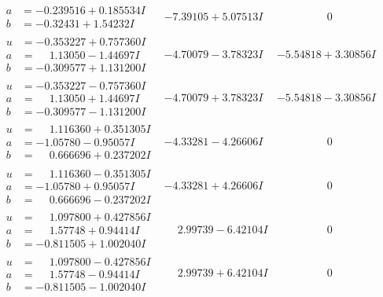 \documentclass[1p]{elsarticle_modified}
\theoremstyle{definition}
\begin{document}
$$\begin{array}{c|c|c}
\begin{aligned}
a &= -0.239516 + 0.185534 I \\
b &= -0.32431 + 1.54232 I\end{aligned}
 & -7.39105 + 5.07513 I & \phantom{-0.000000 } 0 \\ \hline\begin{aligned}
u &= -0.353227 + 0.757360 I \\
a &= \phantom{-}1.13050 - 1.44697 I \\
b &= -0.309577 + 1.131200 I\end{aligned}
 & -4.70079 - 3.78323 I & -5.54818 + 3.30856 I \\ \hline\begin{aligned}
u &= -0.353227 - 0.757360 I \\
a &= \phantom{-}1.13050 + 1.44697 I \\
b &= -0.309577 - 1.131200 I\end{aligned}
 & -4.70079 + 3.78323 I & -5.54818 - 3.30856 I \\ \hline\begin{aligned}
u &= \phantom{-}1.116360 + 0.351305 I \\
a &= -1.05780 - 0.95057 I \\
b &= \phantom{-}0.666696 + 0.237202 I\end{aligned}
 & -4.33281 - 4.26606 I & \phantom{-0.000000 } 0 \\ \hline\begin{aligned}
u &= \phantom{-}1.116360 - 0.351305 I \\
a &= -1.05780 + 0.95057 I \\
b &= \phantom{-}0.666696 - 0.237202 I\end{aligned}
 & -4.33281 + 4.26606 I & \phantom{-0.000000 } 0 \\ \hline\begin{aligned}
u &= \phantom{-}1.097800 + 0.427856 I \\
a &= \phantom{-}1.57748 + 0.94414 I \\
b &= -0.811505 + 1.002040 I\end{aligned}
 & \phantom{-}2.99739 - 6.42104 I & \phantom{-0.000000 } 0 \\ \hline\begin{aligned}
u &= \phantom{-}1.097800 - 0.427856 I \\
a &= \phantom{-}1.57748 - 0.94414 I \\
b &= -0.811505 - 1.002040 I\end{aligned}
 & \phantom{-}2.99739 + 6.42104 I & \phantom{-0.000000 } 0 \\ \hline\begin{aligned}

\end{aligned}
\end{array}$$
\end{document}
